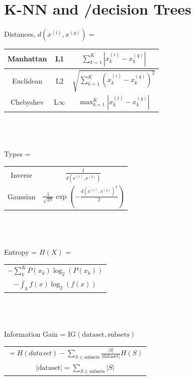 \documentclass[a4paper, 10pt, twocolumn]{article}
\begin{document}
\setlength{\parindent}{0pt}
\section{K-NN and /decision Trees}
Distances, $d(x^{(i)},x^{(q)})$ = \\
\begin{tabular}{| c | c | c | }
	\hline
	Manhattan & L1 & $\sum^{K}_{k=1}|x^{(i)}_{k} - x_{k}^{(q)}|$ \\ 
	\hline
	Euclidean & L2 & $\sqrt{\sum^{K}_{k=1}(x^{(i)}_{k} - x_{k}^{(q)})^2}$  \\  
	\hline
	Chebyshev & L$\infty$ & $\max^K_{k=1}|x^{(i)}_{k} - x_{k}^{(q)}|$  \\
	\hline 
\end{tabular} \\ \\ \\
Types = 
\begin{tabular}{ c c }
	Inverse & $\frac{1}{d(x^{(i)},x^{(q)})}$ \\ 
	Gaussian & $\frac{1}{\sqrt{2 \pi}}\exp(-\frac{d(x^{(i)},x^{(q)})^2}{2})$  \\     
\end{tabular} \\ \\ \\
Entropy = $H(X)$ =
\begin{tabular}{ c }
	$-\sum^K_k P(x_k) \log_2(P(x_k))$ \\
	$-\int_k f(x) \log_2(f(x))$
\end{tabular} \\ \\ \\
Information Gain = $\textrm{IG}(\textrm{dataset},\textrm{subsets})$\\ 
\begin{tabular} {c}
	$ = H(dataset) - \sum_{S \in \textrm{subsets}} \frac{|S|}{|\textrm{dataset}|}H(S)$ \\
	$|\textrm{dataset}| = \sum_{S \in \textrm{subsets}} |S|$
\end{tabular}
\end{document}
